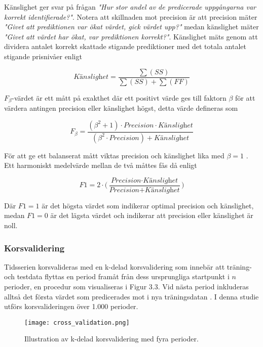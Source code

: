 \documentclass[11pt]{article}
\numberwithin{equation}{section}
\numberwithin{table}{section}
\numberwithin{figure}{section}
\begin{document}
Känslighet ger svar på frågan \emph{"Hur stor andel av de predicerade uppgångarna var korrekt identifierade?"}. Notera att skillnaden mot precision är att precision mäter \emph{"Givet att prediktionen var ökat värdet, gick värdet upp?"} medan känslighet mäter \emph{"Givet att värdet har ökat, var prediktionen korrekt?"}. Känslighet mäts genom att dividera antalet korrekt skattade stigande prediktioner med det totala antalet stigande prisnivåer enligt

\begin{equation}
    \textit{Känslighet} = \frac{\sum(SS)}{\sum(SS)+\sum(FF)}
\end{equation}

$F_{\beta}$-värdet är ett mått på exakthet där ett positivt värde ges till faktorn $\beta$ för att värdera antingen precision eller känslighet högst, detta värde defineras som

\begin{equation}
    F_{\beta} = \frac{(\beta^2+1) \cdot \textit{Precision} \cdot 
    \textit{Känslighet}}{(\beta^2 \cdot \textit{Precision}) + \textit{Känslighet}}
\end{equation}

För att ge ett balanserat mått viktas precision och känslighet lika med $\beta=1$ \parencite{ModelValidation}. Ett harmoniskt medelvärde mellan de två måttes fås då enligt

\begin{equation}
    \textit{F1} = 2 \cdot \Big( \frac{\textit{Precision} \cdot \textit{Känslighet}}{\textit{Precision} + \textit{Känslighet}} \Big)
\end{equation}

Där $F1=1$ är det högsta värdet som indikerar optimal precision och känslighet, medan $F1=0$ är det lägsta värdet och indikerar att precision eller känslighet är noll.


\subsubsection{Korsvalidering}
Tidsserien korsvalideras med en k-delad korsvalidering som innebär att träning- och testdata flyttas en period framåt från dess ursprungliga startpunkt i $n$ perioder, en procedur som visualiseras i Figur 3.3. Vid nästa period inkluderas alltså det första värdet som predicerades mot i nya träningsdatan \parencite{bergmeir2018note}. I denna studie utförs korsvalideringen över 1.000 perioder. 

\begin{figure}[H]
\caption{Illustration av k-delad korsvalidering med fyra perioder.}
\texttt{[image: cross\_validation.png]}
\centering
\end{figure}
\end{document}
